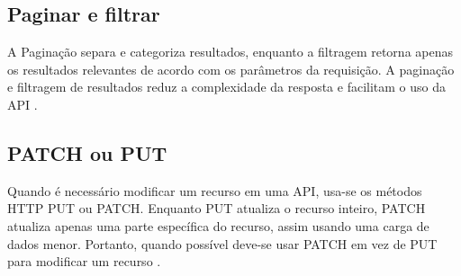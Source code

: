 \subsection{Paginar e filtrar}
A Paginação separa e categoriza resultados, enquanto a filtragem retorna apenas os resultados relevantes de acordo com os parâmetros da requisição. A paginação e filtragem de resultados reduz a complexidade da resposta e facilitam o uso da API \cite{rapidAPI-twitter}.

\subsection{PATCH ou PUT}
Quando é necessário modificar um recurso em uma API, usa-se os métodos HTTP PUT ou PATCH. Enquanto PUT atualiza o recurso inteiro, PATCH atualiza apenas uma parte específica do recurso, assim usando uma carga de dados menor. Portanto, quando possível deve-se usar PATCH em vez de PUT para modificar um recurso \cite{rapidAPI-twitter}.










